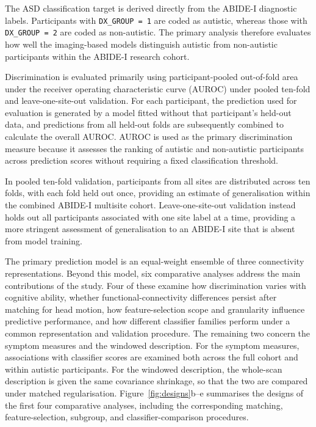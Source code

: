 The ASD classification target is derived directly from the ABIDE-I diagnostic labels.
Participants with \texttt{DX\_GROUP = 1} are coded as autistic, whereas those with
\texttt{DX\_GROUP = 2} are coded as non-autistic. The primary analysis therefore evaluates
how well the imaging-based models distinguish autistic from non-autistic participants within
the ABIDE-I research cohort.

Discrimination is evaluated primarily using participant-pooled out-of-fold area under the
receiver operating characteristic curve (AUROC) under pooled ten-fold and
leave-one-site-out validation. For each participant, the prediction used for evaluation is
generated by a model fitted without that participant's held-out data, and predictions from
all held-out folds are subsequently combined to calculate the overall AUROC. AUROC is used
as the primary discrimination measure because it assesses the ranking of autistic and
non-autistic participants across prediction scores without requiring a fixed classification
threshold.

In pooled ten-fold validation, participants from all sites are distributed across ten folds,
with each fold held out once, providing an estimate of generalisation within the combined
ABIDE-I multisite cohort. Leave-one-site-out validation instead holds out all participants
associated with one site label at a time, providing a more stringent assessment of
generalisation to an ABIDE-I site that is absent from model training.

The primary prediction model is an equal-weight ensemble of three connectivity representations. Beyond this model, six comparative analyses address the main contributions of the study. Four of these examine how discrimination varies with cognitive ability, whether functional-connectivity differences persist after matching for head motion, how feature-selection scope and granularity influence predictive performance, and how different classifier families perform under a common representation and validation procedure. The remaining two concern the symptom measures and the windowed description. For the symptom measures, associations with classifier scores are examined both across the full cohort and within autistic participants. For the windowed description, the whole-scan description is given the same covariance shrinkage, so that the two are compared under matched regularisation. Figure~\ref{fig:designs}b--e summarises the designs of the first four comparative analyses, including the corresponding matching, feature-selection, subgroup, and classifier-comparison procedures.


